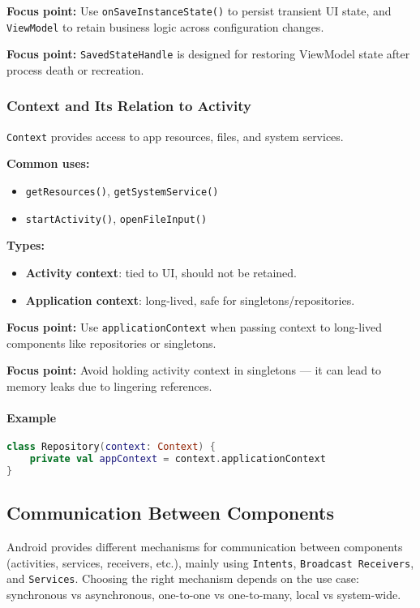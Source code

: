 \documentclass[a4paper,12pt]{article}
\begin{document}
\textbf{Focus point:} Use \texttt{onSaveInstanceState()} to persist transient UI state, and \texttt{ViewModel} to retain business logic across configuration changes.

\textbf{Focus point:} \texttt{SavedStateHandle} is designed for restoring ViewModel state after process death or recreation.

\subsubsection{Context and Its Relation to Activity}

\texttt{Context} provides access to app resources, files, and system services.

\textbf{Common uses:}
\begin{itemize}
  \item \texttt{getResources()}, \texttt{getSystemService()}
  \item \texttt{startActivity()}, \texttt{openFileInput()}
\end{itemize}

\textbf{Types:}
\begin{itemize}
  \item \textbf{Activity context}: tied to UI, should not be retained.
  \item \textbf{Application context}: long-lived, safe for singletons/repositories.
\end{itemize}

\textbf{Focus point:} Use \texttt{applicationContext} when passing context to long-lived components like repositories or singletons.

\textbf{Focus point:} Avoid holding activity context in singletons — it can lead to memory leaks due to lingering references.

\paragraph{Example}
\begin{lstlisting}[language=Kotlin]
class Repository(context: Context) {
    private val appContext = context.applicationContext
}
\end{lstlisting}


\subsection{Communication Between Components}

Android provides different mechanisms for communication between components (activities, services, receivers, etc.), mainly using \texttt{Intents}, \texttt{Broadcast Receivers}, and \texttt{Services}. Choosing the right mechanism depends on the use case: synchronous vs asynchronous, one-to-one vs one-to-many, local vs system-wide.
\end{document}
